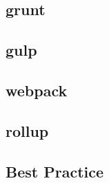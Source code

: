 \subsection{grunt}
\label{sub:grunt}
\subsection{gulp}
\label{sub:gulp}
\subsection{webpack}
\label{sub:webpack}
\subsection{rollup}
\label{sub:rollup}
\subsection{Best Practice}
\label{sub:build-tools-best-practices}
